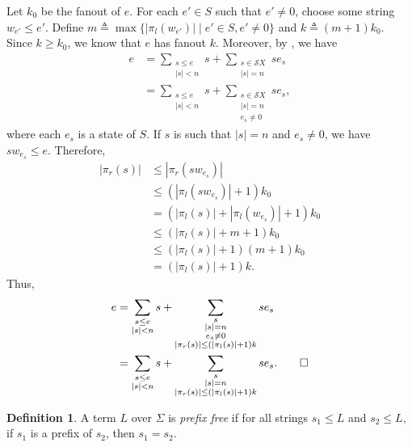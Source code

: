 \documentclass[11pt,a4paper]{amsart}
\theoremstyle{definition}
\newtheorem{definition}[theorem]{Definition}
\begin{document}
\begin{proofEnd}
  Let $k_0$ be the fanout of $e$.  For each $e'  \in  S$ such that $e'  \neq  0$, choose
  some string $w_{e'}  \leq  e'$.  Define
  $m  \triangleq  \max\{| \pi _l(w_{e'})|  \mid  e'  \in  S, e'  \neq  0 \}$ and $k \triangleq (m+1)k_0$. Since
  $k  \geq  k_0$, we know that $e$ has fanout $k$.  Moreover, by
  , we have
  \begin{align*}
    e
    & =  \sum _{\substack{s  \leq  e\\ |s| < n}} s + %
     \sum _{\substack{s  \in  \mathcal{S}X \\ |s|=n}} se_s \\
    & =  \sum _{\substack{s  \leq  e \\ |s| < n}} s + %
     \sum _{\substack{s  \in  \mathcal{S}X \\ |s|=n \\ e_s  \neq  0}}se_s,
  \end{align*}
  where each $e_s$ is a state of $S$.  If $s$ is such that $|s|=n$ and
  $e_s  \neq  0$, we have $sw_{e_s}  \leq  e$.  Therefore,
  \begin{align*}
    | \pi _r(s)|
    &  \leq  | \pi _r(sw_{e_s})| \\
    &  \leq  (| \pi _l(sw_{e_s})|+1)k_0 \\
    & = (| \pi _l(s)|+| \pi _l(w_{e_s})|+1)k_0 \\
    &  \leq  (| \pi _l(s)|+m+1)k_0 \\
    &  \leq  (| \pi _l(s)|+1)(m+1)k_0 \\
    & = (| \pi _l(s)|+1)k.
  \end{align*}
  Thus,
  \begin{align*}
    e
    & =  \sum _{\substack{s  \leq  e \\ |s| < n}} s + %
     \sum _{\substack{s \\ |s|=n \\ e_s  \neq  0 \\ | \pi _r(s)| \leq (| \pi _l(s)|+1)k} }se_s \\
    & =  \sum _{\substack{s  \leq  e \\ |s| < n}} s + %
     \sum _{\substack{s \\ |s|=n \\ | \pi _r(s)| \leq (| \pi _l(s)|+1)k}} se_s. \qedhere
  \end{align*}
\end{proofEnd}

\begin{definition}
  \label{def:prefix-free}
  A term $L$ over $ \Sigma $ is \emph{prefix free} if for all strings $s_1  \leq  L$ and
  $s_2  \leq  L$, if $s_1$ is a prefix of $s_2$, then $s_1 = s_2$.
\end{definition}
\end{document}
